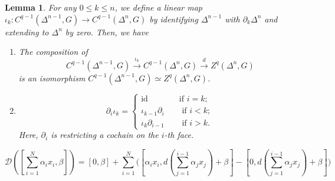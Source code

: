 \documentclass[10pt,a4paper]{amsart}
\newtheorem{lemma}{Lemma}
\newcommand{\id}{{\operatorname{id}}}
\begin{document}
\begin{lemma}\label{lemmaCochainTool}
	For any $0\le k\le n$, we define a linear map $\iota_k:C^{q-1}(\Delta^{n-1},G)\rightarrow C^{q-1}(\Delta^{n},G)$ by identifying $\Delta^{n-1}$ with $\partial_k\Delta^n$ and extending to $\Delta^n$ by zero. Then, we have
	\begin{enumerate}
		\item The composition of 
		\begin{equation}
			C^{q-1}(\Delta^{n-1},G)\xrightarrow{\iota_k}C^{q-1}(\Delta^{n},G)\xrightarrow{d}Z^{q}(\Delta^{n},G)
		\end{equation}
		is an isomorphism $C^{q-1}(\Delta^{n-1},G)\simeq Z^{q}(\Delta^{n},G)$.
		\item 
		\begin{equation}
			\partial_i\iota_k=\left\{
			\begin{aligned}
				\id\quad \quad & \text{if } i=k;\\
				\iota_{k-1}\partial_i\quad & \text{   if } i<k;\\
				\iota_{k}\partial_{i-1}\quad  & \text{   if } i>k.
			\end{aligned}
			\right.
		\end{equation}
		Here, $\partial_i$ is restricting a cochain on the $i$-th face.
		
		
	\end{enumerate}
\end{lemma}

 \begin{equation}\label{eqB37}
 	\mathcal{D}([\sum_{i=1}^N \alpha_ix_i,\beta])=[0,\beta]+\sum_{i=1}^N\bigg([\alpha_ix_i,d(\sum_{j=1}^{i-1}\alpha_jx_j)+\beta]-[0,d(\sum_{j=1}^{i-1}\alpha_jx_j)+\beta]\bigg)
 \end{equation}
\end{document}
